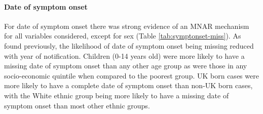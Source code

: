 \documentclass[11pt,twoside]{bristolthesis}
\begin{document}
  \hypertarget{date-of-symptom-onset}{%
  \paragraph{Date of symptom onset}\label{date-of-symptom-onset}}
  
  For date of symptom onset there was strong evidence of an MNAR mechanism for all variables considered, except for sex (Table \ref{tab:symptonset-miss}). As found previously, the likelihood of date of symptom onset being missing reduced with year of notification. Children (0-14 years old) were more likely to have a missing date of symptom onset than any other age group as were those in any socio-economic quintile when compared to the poorest group. UK born cases were more likely to have a complete date of symptom onset than non-UK born cases, with the White ethnic group being more likely to have a missing date of symptom onset than most other ethnic groups.
  
\end{document}
